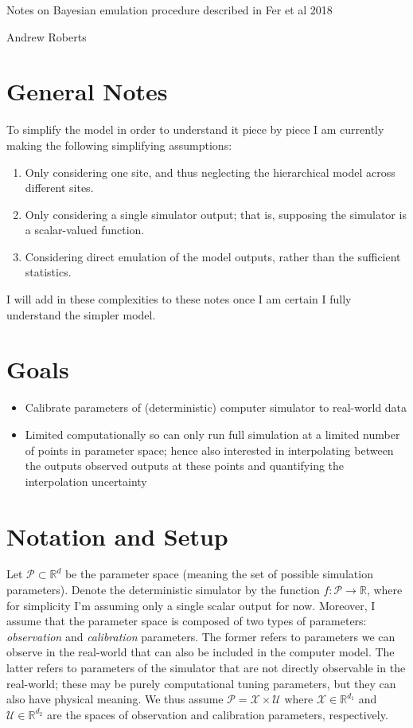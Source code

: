 \documentclass[12pt]{article}
\newcommand{\R}{\mathcal{R}}
\def\R{\mathbb{R}}
\begin{document}
\begin{center}
\Large
Notes on Bayesian emulation procedure described in Fer et al 2018
\end{center}

\begin{flushright}
Andrew Roberts
\end{flushright} 

\section{General Notes}
To simplify the model in order to understand it piece by piece I am currently making the following simplifying assumptions: 
\begin{enumerate}
\item Only considering one site, and thus neglecting the hierarchical model across different sites. 
\item Only considering a single simulator output; that is, supposing the simulator is a scalar-valued function.
\item Considering direct emulation of the model outputs, rather than the sufficient statistics.  
\end{enumerate}
I will add in these complexities to these notes once I am certain I fully understand the simpler model. 

\section{Goals}
\begin{itemize}
\item Calibrate parameters of (deterministic) computer simulator to real-world data
\item Limited computationally so can only run full simulation at a limited number of points in parameter space; hence also interested in interpolating between the 
outputs observed outputs at these points and quantifying the interpolation uncertainty
\end{itemize}

\section{Notation and Setup}
Let $\mathcal{P} \subset \R^d$ be the parameter space (meaning the set of possible simulation parameters). Denote the deterministic simulator by the function $f: \mathcal{P} \to \R$, 
where for simplicity I'm assuming only a single scalar output for now. Moreover, I assume that the parameter space is composed of two types of parameters: \textit{observation}
and \textit{calibration} parameters. The former refers to parameters we can observe in the real-world that can also be included in the computer model. The latter refers
to parameters of the simulator that are not directly observable in the real-world; these may be purely computational tuning parameters, but they can also have physical meaning. 
We thus assume $\mathcal{P} = \mathcal{X} \times \mathcal{U}$ where $\mathcal{X} \in \R^{d_1}$ and $\mathcal{U} \in \R^{d_2}$ are the spaces of observation and calibration
parameters, respectively. 
\end{document}
